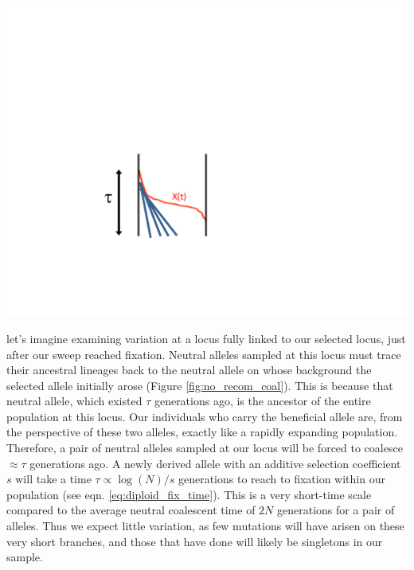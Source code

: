 \begin{marginfigure}
\begin{center}
\includegraphics[width= 0.75 \textwidth]{figures/Hitchhiking/No_recom_coal.pdf}
\end{center}
\caption{} \label{fig:no_recom_coal}
\end{marginfigure}
 let's imagine examining variation at a locus fully linked
to our selected locus, just after our sweep reached fixation. Neutral alleles sampled at this locus
must trace their ancestral lineages back to the neutral
allele on whose background the selected allele initially arose (Figure
\ref{fig:no_recom_coal}). This is because
that  neutral allele, which existed $\tau$ generations ago, is the
ancestor of the entire population at this  locus. Our individuals who
carry the beneficial allele are, from the perspective of these two
alleles, exactly like a rapidly expanding population. Therefore, a
pair of neutral alleles sampled at our  locus will be forced to
coalesce $\approx \tau$ generations ago. A newly derived allele with an additive selection coefficient $s$ will
take a time $\tau \propto \log(N)/s$  generations to reach to fixation
within our population (see eqn. \eqref{eq:diploid_fix_time}). This is a very
short-time scale compared to the average neutral coalescent time of
$2N$ generations for a pair of alleles. Thus we expect little variation,
as few mutations will have arisen on these very short branches, and
those that have done will likely be singletons in our sample. \\

